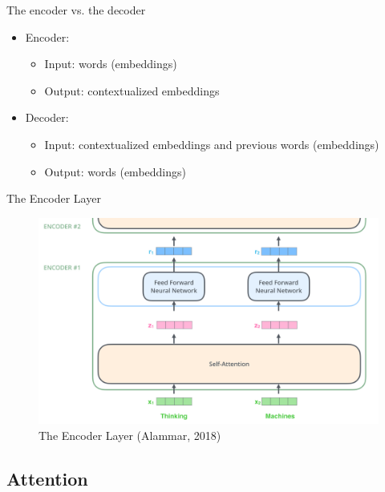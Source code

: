 \documentclass[10pt]{beamer}
\begin{document}
\begin{frame}{The encoder vs. the decoder}

\begin{itemize}
\item Encoder:
\begin{itemize}
\item Input: words (embeddings)
\item Output: contextualized embeddings
\end{itemize}
\item Decoder:
\begin{itemize}
\item Input: contextualized embeddings {\color{uured} and previous words} (embeddings)
\item Output: words (embeddings)
\end{itemize}
\end{itemize}
\end{frame}



\begin{frame}{The Encoder Layer}

\begin{figure}[h]
\centering
\includegraphics[width=1\textwidth]{fig/alammar_encoder_with_tensors_2.png}
\caption{The Encoder Layer (Alammar, 2018)}
\end{figure}

\end{frame}


\subsection{Attention}
\end{document}
